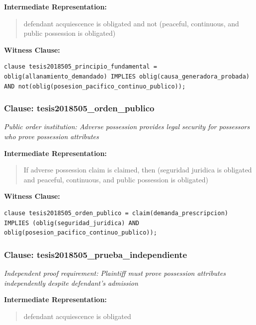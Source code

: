 \documentclass[11pt,a4paper]{article}
\begin{document}
\textbf{Intermediate Representation:}

\begin{quote}
defendant acquiescence is obligated and not (peaceful, continuous, and public possession is obligated)
\end{quote}

\textbf{Witness Clause:}

\begin{lstlisting}[style=witnessstyle, language=Witness]
clause tesis2018505_principio_fundamental = oblig(allanamiento_demandado) IMPLIES oblig(causa_generadora_probada) AND not(oblig(posesion_pacifico_continuo_publico));
\end{lstlisting}

\subsubsection{Clause: tesis2018505\_orden\_publico}

\textit{Public order institution: Adverse possession provides legal security for possessors who prove possession attributes}

\textbf{Intermediate Representation:}

\begin{quote}
If adverse possession claim is claimed, then (seguridad juridica is obligated and peaceful, continuous, and public possession is obligated)
\end{quote}

\textbf{Witness Clause:}

\begin{lstlisting}[style=witnessstyle, language=Witness]
clause tesis2018505_orden_publico = claim(demanda_prescripcion) IMPLIES (oblig(seguridad_juridica) AND oblig(posesion_pacifico_continuo_publico));
\end{lstlisting}

\subsubsection{Clause: tesis2018505\_prueba\_independiente}

\textit{Independent proof requirement: Plaintiff must prove possession attributes independently despite defendant's admission}

\textbf{Intermediate Representation:}

\begin{quote}
defendant acquiescence is obligated
\end{quote}
\end{document}
